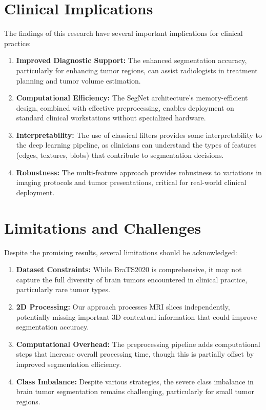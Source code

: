 \section{Clinical Implications}

The findings of this research have several important implications for clinical practice:

\begin{enumerate}
    \item \textbf{Improved Diagnostic Support:} The enhanced segmentation accuracy, particularly for enhancing tumor regions, can assist radiologists in treatment planning and tumor volume estimation.
    
    \item \textbf{Computational Efficiency:} The SegNet architecture's memory-efficient design, combined with effective preprocessing, enables deployment on standard clinical workstations without specialized hardware.
    
    \item \textbf{Interpretability:} The use of classical filters provides some interpretability to the deep learning pipeline, as clinicians can understand the types of features (edges, textures, blobs) that contribute to segmentation decisions.
    
    \item \textbf{Robustness:} The multi-feature approach provides robustness to variations in imaging protocols and tumor presentations, critical for real-world clinical deployment.
\end{enumerate}

\section{Limitations and Challenges}

Despite the promising results, several limitations should be acknowledged:

\begin{enumerate}
    \item \textbf{Dataset Constraints:} While BraTS2020 is comprehensive, it may not capture the full diversity of brain tumors encountered in clinical practice, particularly rare tumor types.
    
    \item \textbf{2D Processing:} Our approach processes MRI slices independently, potentially missing important 3D contextual information that could improve segmentation accuracy.
    
    \item \textbf{Computational Overhead:} The preprocessing pipeline adds computational steps that increase overall processing time, though this is partially offset by improved segmentation efficiency.
    
    \item \textbf{Class Imbalance:} Despite various strategies, the severe class imbalance in brain tumor segmentation remains challenging, particularly for small tumor regions.
\end{enumerate}

